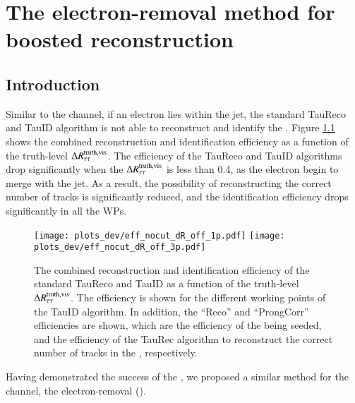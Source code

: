 \chapter{The electron-removal method for boosted \teth reconstruction}

\graphicspath{{1_MainChapters/Chap6_ElecRM/figs/}}

\section{Introduction}
    \label{sec:erm:intro}
    Similar to the \tmth channel, if an electron lies within the \tauseed jet,
    the standard TauReco and TauID algorithm is not able to reconstruct and identify the \tauhad. 
    Figure \ref{fig:erm:dR_eff_off} shows the combined reconstruction and 
    identification efficiency as a function of the truth-level $\Delta R_\mathrm{\tau\tau}^\mathrm{truth, vis}$. 
    The efficiency of the TauReco and TauID algorithms drop significantly when the $\Delta R_\mathrm{\tau\tau}^\mathrm{truth, vis}$ is less than 0.4, as the electron begin to merge with the \tauseed jet. As a result, the 
    possibility of reconstructing the correct number of \tauhad tracks is significantly reduced, 
    and the \tauhad identification efficiency drops significantly in all the WPs.
    \begin{figure}[htbp]
        \centering
        \texttt{[image: plots\_dev/eff\_nocut\_dR\_off\_1p.pdf]}
        \texttt{[image: plots\_dev/eff\_nocut\_dR\_off\_3p.pdf]}
        \caption{The combined reconstruction and identification efficiency of the 
        standard TauReco and TauID as a function of the truth-level $\Delta R_\mathrm{\tau\tau}^\mathrm{truth, vis}$. The
        efficiency is shown for the different working points of the TauID algorithm. 
        In addition, the ``Reco'' and ``ProngCorr'' efficiencies are shown, 
        which are the efficiency of the \tauhad being seeded, and the efficiency 
        of the TauRec algorithm to reconstruct the correct number of tracks in the 
        \tauhad, respectively.}
        \label{fig:erm:dR_eff_off}
    \end{figure}
    Having demonstrated the success of the \tauhadmurm, we proposed a 
    similar method for the \teth channel, the electron-removal \tauhad (\tauhaderm).

